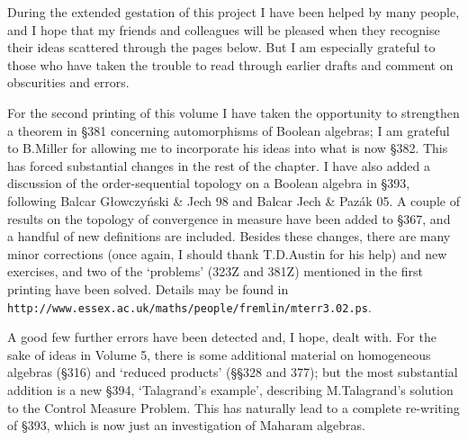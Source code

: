During the extended gestation of this project I have been helped by many
people, and I hope that my friends and colleagues will be pleased when
they recognise their ideas scattered through the pages below.   But I am
especially grateful to those who have taken the trouble to read through
earlier drafts and comment on obscurities and errors.



\medskip



\bigskip


\medskip

For the second printing of this volume I have taken the opportunity to 
strengthen a theorem in \S381 concerning automorphisms of Boolean 
algebras;  I am grateful to B.Miller for allowing me to
incorporate his ideas into what is now \S382.   
This has forced substantial changes in the rest of the chapter.   
I have also added a discussion of the
order-sequential topology on a Boolean algebra in \S393, following
{\smc Balcar G{\l}owczy\'nski \& Jech 98}
and {\smc Balcar Jech \& Paz\'ak 05}.   
A couple of results on the topology of convergence in measure have been 
added to \S367, and a handful of new
definitions are included.   Besides these changes,
there are many minor corrections 
(once again, I should thank T.D.Austin for his help) and new exercises, 
and two of the `problems' (323Z and 381Z) mentioned in the first printing 
have been solved.   Details may be found in 
{\tt http://www.essex.ac.uk/maths/people/fremlin/mterr3.02.ps}.

\bigskip


\medskip

A good few further errors have been detected and, I hope, dealt with.  
For the sake of ideas in Volume 5, there is some additional material on
homogeneous algebras (\S316) and
`reduced products' (\S\S328 and 377);  but the most substantial addition
is a new \S394, `Talagrand's example', describing M.Talagrand's solution to
the Control Measure Problem.   This has naturally lead to a complete
re-writing of \S393, which is now just an investigation of Maharam 
algebras.


